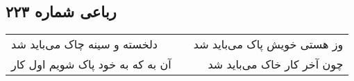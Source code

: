 \begin{center}
\section*{رباعی شماره ۲۲۳}
\label{sec:sh223}
\begin{longtable}{l p{0.5cm} r}
دلخسته و سینه چاک می‌باید شد
&&
وز هستی خویش پاک می‌باید شد
\\
آن به که به خود پاک شویم اول کار
&&
چون آخر کار خاک می‌باید شد
\\
\end{longtable}
\end{center}
